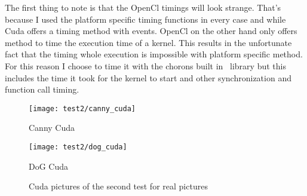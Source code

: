\begin{table}[H]
\centering
{}
\caption{Timings of the first test for real pictures}
\label{tab:test1c}
\end{table}


The first thing to note is that the OpenCl timings will look strange. That's because I used the platform specific timing functions in every case and while Cuda offers a timing method with events. OpenCl on the other hand only offers method to time the execution time of a kernel. This results in the unfortunate fact that the timing whole execution is impossible with platform specific method. For this reason I choose to time it with the chorons built in \CC\ library but this includes the time it took for the kernel to start and other synchronization and function call timing.


\begin{figure}[H]
\centering

\begin{minipage}[t]{.49\textwidth}
\centering
\texttt{[image: test2/canny\_cuda]}
\addtocounter{figure}{-1}
\captionsetup{labelformat=empty}
\caption[]{Canny Cuda}
\end{minipage}
\begin{minipage}[t]{.49\textwidth}
\centering
\texttt{[image: test2/dog\_cuda]}
\addtocounter{figure}{-1}
\captionsetup{labelformat=empty}
\caption[]{DoG Cuda}
\end{minipage}
\caption{Cuda pictures of the second test for real pictures}
\label{fig:test2c}
\end{figure}


